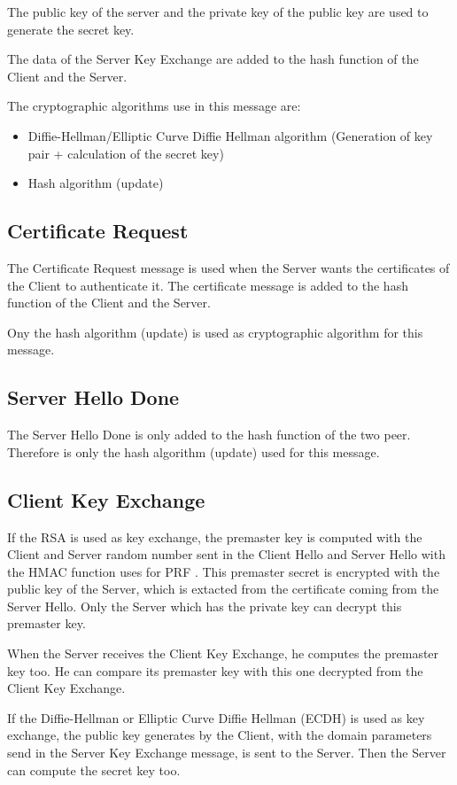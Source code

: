 The public key of the server and the private key of the public key are used to
generate the secret key.

The data of the Server Key Exchange are added to the hash function of the Client
and the Server.

The cryptographic algorithms use in this message are:
\begin{itemize}[noitemsep]
  \item Diffie-Hellman/Elliptic Curve Diffie Hellman algorithm (Generation of
  key pair + calculation of the secret key)
  \item Hash algorithm (update)
\end{itemize}

\subsection*{Certificate Request}
The Certificate Request message is used when the Server wants the certificates
of the Client to authenticate it.
The certificate message is added to the hash function of the Client and the
Server.

Ony the hash algorithm (update) is used as cryptographic algorithm for this
message.

\subsection*{Server Hello Done}
The Server Hello Done is only added to the hash function of the two peer.
Therefore is only the hash algorithm (update) used for this message.

\subsection*{Client Key Exchange}
If the RSA is used as key exchange, the premaster key is computed with the Client and Server random
number sent in the Client Hello and Server Hello with the HMAC function uses for
PRF \cite{RFC5246}.
This premaster secret is encrypted with the public key of the Server, which is
extacted from the certificate coming from the Server Hello.
Only the Server which has the private key can decrypt this premaster key.

When the Server receives the Client Key Exchange, he computes the premaster key
too. He can compare its premaster key with this one decrypted from the Client
Key Exchange.

If the Diffie-Hellman or Elliptic Curve Diffie Hellman (ECDH) is used as key
exchange, the public key generates by the Client, with the domain parameters
send in the Server Key Exchange message, is sent to the Server.
Then the Server can compute the secret key too. 

